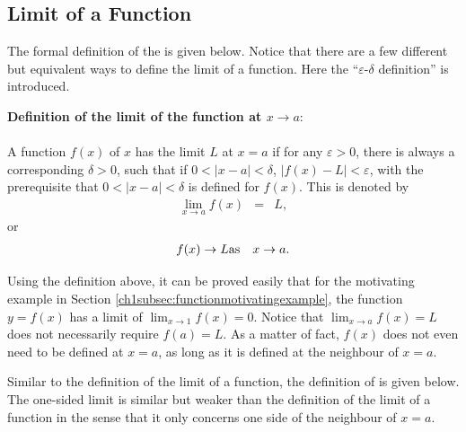 \subsection{Limit of a Function} \label{ch1subsec:definationoflimitoffunction}

The formal definition of the  is given below. Notice that there are a few different but equivalent ways to define the limit of a function. Here the ``$\varepsilon$-$\delta$ definition'' is introduced.

\begin{VF}
\textbf{Definition of the limit of the function at $x\rightarrow a$}:
\\
\\
\noindent A function $f(x)$ of $x$ has the limit $L$ at $x=a$ if for any $\varepsilon > 0$, there is always a corresponding $\delta > 0$, such that if $0<|x-a|<\delta$, $|f(x)-L| < \varepsilon$, with the prerequisite that $0<|x-a|<\delta$ is defined for $f(x)$. This is denoted by
\begin{eqnarray}
   \lim_{x\rightarrow a} f(x) &=& L, \nonumber
\end{eqnarray}
or
\begin{eqnarray}
  f(x) \rightarrow L & \textup{as} & x \rightarrow a. \nonumber
\end{eqnarray}
\end{VF}

Using the definition above, it can be proved easily that for the motivating example in Section \ref{ch1subsec:functionmotivatingexample}, the function $y=f(x)$ has a limit of $\lim_{x\rightarrow 1}f(x)=0$. Notice that $\lim_{x\rightarrow a}f(x)=L$ does not necessarily require $f(a)=L$. As a matter of fact, $f(x)$ does not even need to be defined at $x=a$, as long as it is defined at the neighbour of $x=a$.

Similar to the definition of the limit of a function, the definition of  is given below. The one-sided limit is similar but weaker than the definition of the limit of a function in the sense that it only concerns one side of the neighbour of $x=a$.

